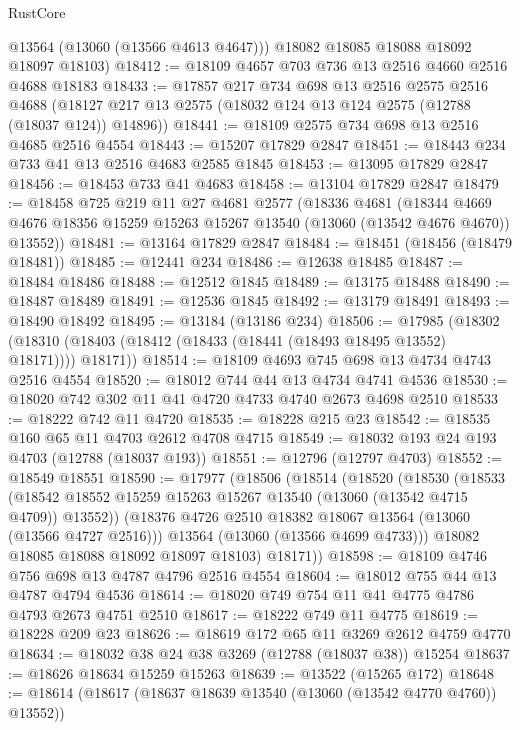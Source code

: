 \begin{lexlean}{RustCore}
\begin{coremodule}
        @13564
        (@13060 (@13566 @4613 @4647)))
      @18082
      @18085
      @18088
      @18092
      @18097
      @18103)
@18412 := @18109 @4657 @703 @736 @13 @2516 @4660 @2516 @4688 @18183
@18433 := @17857
    @217
    @734
    @698
    @13
    @2516
    @2575
    @2516
    @4688
    (@18127 @217 @13 @2575 (@18032 @124 @13 @124 @2575 (@12788 (@18037 @124)) @14896))
@18441 := @18109 @2575 @734 @698 @13 @2516 @4685 @2516 @4554
@18443 := @15207 @17829 @2847
@18451 := @18443 @234 @733 @41 @13 @2516 @4683 @2585 @1845
@18453 := @13095 @17829 @2847
@18456 := @18453 @733 @41 @4683
@18458 := @13104 @17829 @2847
@18479 := @18458
    @725
    @219
    @11
    @27
    @4681
    @2577
    (@18336
      @4681
      (@18344 @4669 @4676 @18356 @15259 @15263 @15267 @13540 (@13060 (@13542 @4676 @4670)) @13552))
@18481 := @13164 @17829 @2847
@18484 := @18451 (@18456 (@18479 @18481))
@18485 := @12441 @234
@18486 := @12638 @18485
@18487 := @18484 @18486
@18488 := @12512 @1845
@18489 := @13175 @18488
@18490 := @18487 @18489
@18491 := @12536 @1845
@18492 := @13179 @18491
@18493 := @18490 @18492
@18495 := @13184 (@13186 @234)
@18506 := @17985
    (@18302 (@18310 (@18403 (@18412 (@18433 (@18441 (@18493 @18495 @13552) @18171)))) @18171))
@18514 := @18109 @4693 @745 @698 @13 @4734 @4743 @2516 @4554
@18520 := @18012 @744 @44 @13 @4734 @4741 @4536
@18530 := @18020 @742 @302 @11 @41 @4720 @4733 @4740 @2673 @4698 @2510
@18533 := @18222 @742 @11 @4720
@18535 := @18228 @215 @23
@18542 := @18535 @160 @65 @11 @4703 @2612 @4708 @4715
@18549 := @18032 @193 @24 @193 @4703 (@12788 (@18037 @193))
@18551 := @12796 (@12797 @4703)
@18552 := @18549 @18551
@18590 := @17977
    (@18506
      (@18514
        (@18520
          (@18530
            (@18533
              (@18542 @18552 @15259 @15263 @15267 @13540 (@13060 (@13542 @4715 @4709)) @13552))
            (@18376 @4726 @2510 @18382 @18067 @13564 (@13060 (@13566 @4727 @2516)))
            @13564
            (@13060 (@13566 @4699 @4733)))
          @18082
          @18085
          @18088
          @18092
          @18097
          @18103)
        @18171))
@18598 := @18109 @4746 @756 @698 @13 @4787 @4796 @2516 @4554
@18604 := @18012 @755 @44 @13 @4787 @4794 @4536
@18614 := @18020 @749 @754 @11 @41 @4775 @4786 @4793 @2673 @4751 @2510
@18617 := @18222 @749 @11 @4775
@18619 := @18228 @209 @23
@18626 := @18619 @172 @65 @11 @3269 @2612 @4759 @4770
@18634 := @18032 @38 @24 @38 @3269 (@12788 (@18037 @38)) @15254
@18637 := @18626 @18634 @15259 @15263
@18639 := @13522 (@15265 @172)
@18648 := @18614 (@18617 (@18637 @18639 @13540 (@13060 (@13542 @4770 @4760)) @13552))

\end{coremodule}
\end{lexlean}
